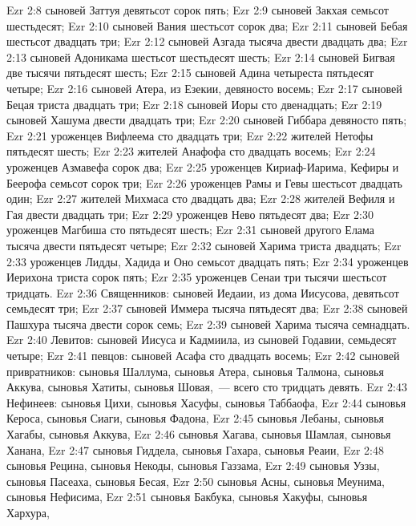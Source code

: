 \vs Ezr 2:8 сыновей Заттуя девятьсот сорок пять;
\vs Ezr 2:9 сыновей Закхая семьсот шестьдесят;
\vs Ezr 2:10 сыновей Вания шестьсот сорок два;
\vs Ezr 2:11 сыновей Бебая шестьсот двадцать три;
\vs Ezr 2:12 сыновей Азгада тысяча двести двадцать два;
\vs Ezr 2:13 сыновей Адоникама шестьсот шестьдесят шесть;
\vs Ezr 2:14 сыновей Бигвая две тысячи пятьдесят шесть;
\vs Ezr 2:15 сыновей Адина четыреста пятьдесят четыре;
\vs Ezr 2:16 сыновей Атера, из  Езекии, девяносто восемь;
\vs Ezr 2:17 сыновей Бецая триста двадцать три;
\vs Ezr 2:18 сыновей Иоры сто двенадцать;
\vs Ezr 2:19 сыновей Хашума двести двадцать три;
\vs Ezr 2:20 сыновей Гиббара девяносто пять;
\vs Ezr 2:21 уроженцев Вифлеема сто двадцать три;
\vs Ezr 2:22 жителей Нетофы пятьдесят шесть;
\vs Ezr 2:23 жителей Анафофа сто двадцать восемь;
\vs Ezr 2:24 уроженцев Азмавефа сорок два;
\vs Ezr 2:25 уроженцев Кириаф-Иарима, Кефиры и Беерофа семьсот сорок три;
\vs Ezr 2:26 уроженцев Рамы и Гевы шестьсот двадцать один;
\vs Ezr 2:27 жителей Михмаса сто двадцать два;
\vs Ezr 2:28 жителей Вефиля и Гая двести двадцать три;
\vs Ezr 2:29 уроженцев Нево пятьдесят два;
\vs Ezr 2:30 уроженцев Магбиша сто пятьдесят шесть;
\vs Ezr 2:31 сыновей другого Елама тысяча двести пятьдесят четыре;
\vs Ezr 2:32 сыновей Харима триста двадцать;
\vs Ezr 2:33 уроженцев Лидды, Хадида и Оно семьсот двадцать пять;
\vs Ezr 2:34 уроженцев Иерихона триста сорок пять;
\vs Ezr 2:35 уроженцев Сенаи три тысячи шестьсот тридцать.
\rsbpar\vs Ezr 2:36 Священников: сыновей Иедаии, из дома Иисусова, девятьсот семьдесят три;
\vs Ezr 2:37 сыновей Иммера тысяча пятьдесят два;
\vs Ezr 2:38 сыновей Пашхура тысяча двести сорок семь;
\vs Ezr 2:39 сыновей Харима тысяча семнадцать.
\rsbpar\vs Ezr 2:40 Левитов: сыновей Иисуса и Кадмиила, из сыновей Годавии, семьдесят четыре;
\vs Ezr 2:41 певцов: сыновей Асафа сто двадцать восемь;
\vs Ezr 2:42 сыновей привратников: сыновья Шаллума, сыновья Атера, сыновья Талмона, сыновья Аккува, сыновья Хатиты, сыновья Шовая,~--- всего сто тридцать девять.
\rsbpar\vs Ezr 2:43 Нефинеев: сыновья Цихи, сыновья Хасуфы, сыновья Таббаофа,
\vs Ezr 2:44 сыновья Кероса, сыновья Сиаги, сыновья Фадона,
\vs Ezr 2:45 сыновья Лебаны, сыновья Хагабы, сыновья Аккува,
\vs Ezr 2:46 сыновья Хагава, сыновья Шамлая, сыновья Ханана,
\vs Ezr 2:47 сыновья Гиддела, сыновья Гахара, сыновья Реаии,
\vs Ezr 2:48 сыновья Рецина, сыновья Некоды, сыновья Газзама,
\vs Ezr 2:49 сыновья Уззы, сыновья Пасеаха, сыновья Бесая,
\vs Ezr 2:50 сыновья Асны, сыновья Меунима, сыновья Нефисима,
\vs Ezr 2:51 сыновья Бакбука, сыновья Хакуфы, сыновья Хархура,
